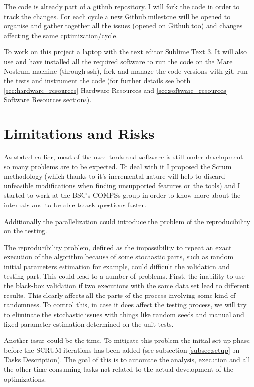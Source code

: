 The code is already part of a github repository. I will fork the code in order to track the changes. For each cycle a new Github milestone will be opened to organise and gather together all the issues (opened on Github too) and changes affecting the same optimization/cycle. 

To work on this project a laptop with the text editor Sublime Text 3. It will also use and have installed all the required software to run the code on the Mare Nostrum machine (through ssh), fork and manage the code versions with git, run the tests and instrument the code (for further details see both \ref{sec:hardware_resources} Hardware Resources and \ref{sec:software_resources} Software Resources sections).

\section{Limitations and Risks}

As stated earlier, most of the used tools and software is still under development so many problems are to be expected. To deal with it I proposed the Scrum methodology (which thanks to it's incremental nature will help to discard unfeasible modifications when finding unsupported features on the tools) and I started to work at the BSC's COMPSs group in order to know more about the internals and to be able to ask questions faster.

Additionally the parallelization could introduce the problem of the reproducibility on the testing. 

The reproducibility problem, defined as the impossibility to repeat an exact execution of the algorithm because of some stochastic parts, such as random initial parameters estimation for example, could difficult the validation and testing part. This could lead to a number of problems. First, the inability to use the black-box validation if two executions with the same data set lead to different results. This clearly affects all the parts of the process involving some kind of randomness. To control this, in case it does affect the testing process, we will try to eliminate the stochastic issues with things like random seeds and manual and fixed parameter estimation determined on the unit tests.

Another issue could be the time. To mitigate this problem the initial set-up phase before the SCRUM iterations has been added (see subsection \ref{subsec:setup} on Tasks Description). The goal of this is to automate the analysis, execution and all the other time-consuming tasks not related to the actual development of the optimizations. 

